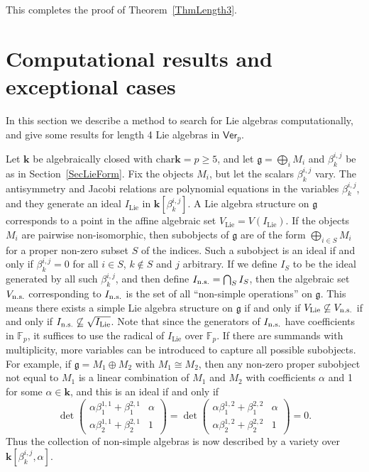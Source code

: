 \documentclass[11pt,a4paper,reqno]{amsart}
\theoremstyle{definition}
\newcommand{\bk}{\mathbf{k}}
\numberwithin{equation}{section}
\newcommand{\charr}{\mathrm{char}}
\newcommand{\Ver}{\mathsf{Ver}}
\newcommand{\fg}{\mathfrak{g}}
\newcommand{\Lie}{\mathrm{Lie}}
\newcommand{\mF}{\mathbb{F}}
\begin{document}
This completes the proof of Theorem~\ref{ThmLength3}.



\section{Computational results and exceptional cases}\label{SecComp}

In this section we describe a method to search for Lie algebras computationally, and give some results for length 4 Lie algebras in $\Ver_p$.

Let $\bk$ be algebraically closed with $\charr\bk=p\geq5$, and let $\fg=\bigoplus_i M_i$ and $\beta^{i,j}_k$ be as in Section~\ref{SecLieForm}. Fix the objects $M_i$, but let the scalars $\beta^{i,j}_k$ vary. The antisymmetry and Jacobi relations are polynomial equations in the variables $\beta^{i,j}_k$, and they generate an ideal $I_{\Lie}$ in $\bk[\beta^{i,j}_k]$. A Lie algebra structure on $\fg$ corresponds to a point in the affine algebraic set $V_{\Lie}=V(I_{\Lie})$. If the objects $M_i$ are pairwise non-isomorphic, then subobjects of $\fg$ are of the form $\bigoplus_{i\in S}M_i$ for a proper non-zero subset $S$ of the indices. Such a subobject is an ideal if and only if $\beta^{i,j}_k=0$ for all $i\in S$, $k\not\in S$ and $j$ arbitrary. If we define $I_S$ to be the ideal generated by all such $\beta^{i,j}_k$, and then define $I_{\rm n.s.}=\bigcap_S I_S$, then the algebraic set $V_{\rm n.s.}$ corresponding to $I_{\rm n.s.}$ is the set of all ``non-simple operations'' on $\fg$. This means there exists a simple Lie algebra structure on $\fg$ if and only if $V_{\Lie}\not\subseteq V_{\rm n.s.}$ if and only if $I_{\rm n.s.}\not\subseteq\sqrt{I_{\Lie}}$. Note that since the generators of $I_{\rm n.s.}$ have coefficients in $\mF_p$, it suffices to use the radical of $I_{\Lie}$ over $\mF_p$. If there are summands with multiplicity, more variables can be introduced to capture all possible subobjects. For example, if $\fg=M_1\oplus M_2$ with $M_1\cong M_2$, then any non-zero proper subobject not equal to $M_1$ is a linear combination of $M_1$ and $M_2$ with coefficients $\alpha$ and 1 for some $\alpha\in\bk$, and this is an ideal if and only if
\[\det\begin{pmatrix}\alpha\beta^{1,1}_1+\beta^{2,1}_1&\alpha\\\alpha\beta^{1,1}_2+\beta^{2,1}_2&1\end{pmatrix}=\det\begin{pmatrix}\alpha\beta^{1,2}_1+\beta^{2,2}_1&\alpha\\\alpha\beta^{1,2}_2+\beta^{2,2}_2&1\end{pmatrix}=0.\]
Thus the collection of non-simple algebras is now described by a variety over $\bk[\beta^{i,j}_k,\alpha]$.
\end{document}
